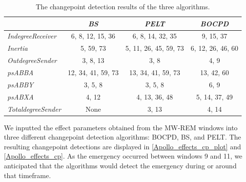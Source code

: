 \documentclass[]{interact}
\theoremstyle{plain}%
\theoremstyle{definition}
\theoremstyle{remark}
\begin{document}
    \begin{table}[H]
    	\centering
    	\renewcommand{\arraystretch}{1.2} %
    	\small
    	\caption{The changepoint detection results of the three algorithms.}
    	\begin{tabular}{lccc}
    		\hline
    		& \textit{BS}        & \textit{PELT}         & \textit{BOCPD}                   \\ \hline
    		\textit{IndegreeReceiver}  & 6, 8, 12, 15, 36   & 6, 8, 14, 32, 35      & {\color[HTML]{000000} 9, 15, 37} \\
    		\textit{Inertia}           & 5, 59, 73          & 5, 11, 26, 45, 59, 73 & 6, 12, 26, 46, 60                \\
    		\textit{OutdegreeSender}   & 3, 8, 13           & 3, 8                  & 4, 9                             \\
    		\textit{psABBA}            & 12, 34, 41, 59, 73 & 13, 34, 41, 59, 73    & 13, 42, 60                       \\
    		\textit{psABBY}            & 3, 5, 8            & 3, 5, 8               & 6, 9                             \\
    		\textit{psABXA}            & 4, 12              & 4, 13, 36, 48         & 5, 14, 37, 49                    \\
    		\textit{TotaldegreeSender} & None               & 3, 13                 & 4, 14                            \\ \hline
    	\end{tabular}
    	\label{Apollo_effects_cp}
    \end{table}
	
	We inputted the effect parameters obtained from the MW-REM windows into three different changepoint detection algorithms: BOCPD, BS, and PELT. The resulting changepoint detections are displayed in \autoref{Apollo_effects_cp_plot} and \autoref{Apollo_effects_cp}. As the emergency occurred between windows 9 and 11, we anticipated that the algorithms would detect the emergency during or around that timeframe. \\
	
\end{document}
